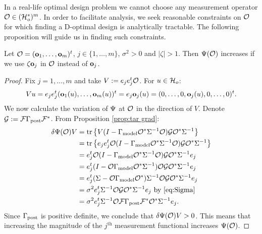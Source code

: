 In a real-life optimal design problem we cannot choose any measurement
operator $\mathcal{O} \in (\mathcal{H}_o^*)^m$. In order to facilitate analysis, we
seek reasonable constraints on $\mathcal{O}$ for which finding a D-optimal
design is analytically tractable. The following proposition will guide
us in finding such constraints.

\begin{proposition}\label{prop:bigger better}
  Let $\mathcal{O} = (\mathbf{o}_1,\dots,\mathbf{o}_m)^t$, $j \in \{1,\dots,m\}$,
  $\sigma^2 > 0$ and $|\zeta| > 1$. Then $\Psi(\mathcal{O})$ increases if we
  use $\zeta \mathbf{o}_j$ in $\mathcal{O}$ instead of $\mathbf{o}_j$.
\end{proposition}

\begin{proof} 
  Fix $j=1,\dots,m$ and take $V:= e_j e_j^t \mathcal{O}$. For $u
  \in \mathcal{H}_o$:
  \begin{equation*}
    Vu = e_je_j^t (\meas_1(u),\dots,\meas_m(u) )^t = e_j \meas_j(u)
    = (0,\dots,0,\meas_j(u),0,\dots,0)^t.
  \end{equation*}
  We now calculate the variation of $\Psi$ at $\mathcal{O}$ in the direction
  of $V$. Denote $\mathcal{G}: = \mathcal{F} \Gamma_{\textup{post}} \mathcal{F}^*$. From Proposition
  \ref{prop:tar grad}:
  \begin{align*}
     \delta \tar(\obs) V 
    &= \tr{V ( I - \modcov \obs^*\Sigma^{-1}\obs) \tmp \obs^* \Sigma^{-1}} \\
    &= \tr{e_je_j^t \obs ( I - \modcov \obs^*\Sigma^{-1}\obs) \tmp \obs^* \Sigma^{-1}} \\
    &= e_j^t \obs ( I - \modcov \obs^*\Sigma^{-1}\obs) \tmp \obs^* \Sigma^{-1}e_j \\
    &= e_j^t ( I - \obs \modcov \obs^*\Sigma^{-1})\obs \tmp \obs^* \Sigma^{-1}e_j \\  
    &=  e_j^t(\Sigma-\obs \modcov \obs^*) \Sigma^{-1}\obs \tmp \obs^* \Sigma^{-1}e_j \\
    &=\sigma^2 e_j^t \Sigma^{-1}\obs \tmp \obs^* \Sigma^{-1}e_j
    \text{ by \eqref{eq:Sigma} }\\
    &=\sigma^2 e_j^t \Sigma^{-1}\obs \fwd \postcov \fwd^* \obs^* \Sigma^{-1}e_j.
  \end{align*} 
  Since $\Gamma_{\textup{post}}$ is positive definite, we conclude that $\delta
  \Psi(\mathcal{O}) V > 0$. This means that increasing the magnitude of the
  $j^{\text{th}}$ measurement functional increases $\Psi(\mathcal{O})$.
\end{proof}

